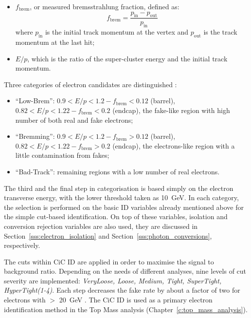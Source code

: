 \begin{itemize}
  \item $f_\text{brem}$, or measured bremsstrahlung fraction, defined as:
  \begin{equation}
  \label{eq:fbrem}
    f_\text{brem} = \frac{p_\text{in}-p_\text{out}}{p_\text{in}}
  \end{equation}
  where $p_\text{in}$ is the initial track momentum at the vertex and $p_\text{out}$ is the track momentum at the last
  hit;
  \item $E/p$, which is the ratio of the super-cluster energy and the initial track momentum.
\end{itemize}

Three categories of electron candidates are distinguished \autocite{CiC_ID}:
\begin{itemize}
  \item ``Low-Brem'': $0.9 < E/p < 1.2 - f_\text{brem} < 0.12$ (barrel), $0.82 < E/p < 1.22 - f_\text{brem} < 0.2$
  (endcap), the fake-like region with high number of both real and fake electrons;
  \item ``Bremming'': $0.9 < E/p < 1.2 - f_\text{brem} > 0.12$ (barrel), $0.82 < E/p < 1.22 - f_\text{brem} > 0.2$
  (endcap), the electrons-like region with a little contamination from fakes;
  \item ``Bad-Track'': remaining regions with a low number of real electrons.
\end{itemize}

The third and the final step in categorisation is based simply on the electron transverse energy, with the lower
threshold taken as \SI{10}{\GeV}. In each category, the selection is performed on the basic ID variables already
mentioned above for the simple cut-based identification. On top of these variables, isolation and conversion rejection
variables are also used, they are discussed in Section~\ref{sss:electron_isolation} and
Section~\ref{sss:photon_conversions}, respectively.

The cuts within CiC ID are applied in order to maximise the signal to background ratio. Depending on the needs of
different analyses, nine levels of cut severity are implemented: \textit{VeryLoose, Loose, Medium, Tight, SuperTight,
HyperTight(1-4)}. Each step decreases the fake rate by about a factor of two for electrons with \ET$>$ \SI{20}{\GeV}
\autocite{CiC_ID}. The CiC ID is used as a primary electron identification method in the Top Mass analysis
(Chapter~\ref{c:top_mass_analysis}).

